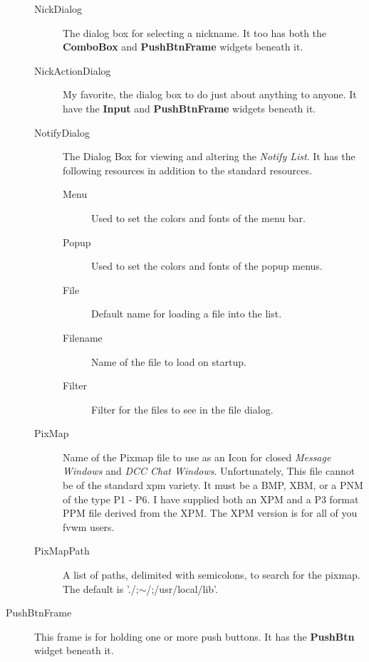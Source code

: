 \documentclass[titlepage]{article}
\begin{document}
\begin{description}
\begin{description}
\item[NickDialog] The dialog box for selecting a nickname. It too has
both the \textbf{ComboBox} and \textbf{PushBtnFrame} widgets beneath it.

\item[NickActionDialog] My favorite, the dialog box to do just about
anything to anyone. It have the \textbf{Input} and \textbf{PushBtnFrame} widgets beneath
it.

\item[NotifyDialog] The Dialog Box for viewing and altering the \emph{Notify
List}. It has the following resources in addition to the standard
resources.
\begin{description}
\item[Menu] Used to set the colors and fonts of the menu bar.
\item[Popup] Used to set the colors and fonts of the popup menus.
\item[File] Default name for loading a file into the list.
\item[Filename] Name of the file to load on startup.
\item[Filter] Filter for the files to see in the file dialog.
\end{description}

\item[PixMap] Name of the Pixmap file to use as an Icon for closed
\textit{Message Windows} and \textit{DCC Chat Windows}. Unfortunately,
This file cannot be of the standard xpm variety. It must be a BMP,
XBM, or a PNM of the type P1 - P6. I have supplied both an XPM and a
P3 format PPM file derived from the XPM. The XPM version is for all of
you fvwm users. 

\item[PixMapPath] A list of paths, delimited with semicolons, to
search for the pixmap. The default is './;$\sim$/;/usr/local/lib'.
\end{description}

\item[PushBtnFrame] This frame is for holding one or more push
buttons. It has the \textbf{PushBtn} widget beneath it.


\end{description}
\end{document}
